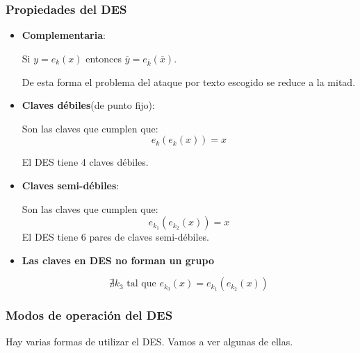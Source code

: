  \subsubsection{Propiedades del DES}
 \begin{itemize}
 	
 
 \item \textbf{Complementaria}: 
 
 Si $y = e_k(x)$ entonces $\overline{y} = e_{\overline{k}}(\overline{x})$.
 
 De esta forma el problema del ataque por texto escogido se reduce a la mitad.
 
 \item \textbf{Claves débiles}(de punto fijo):
 
  Son las claves que cumplen que: $$e_k(e_k(x))= x$$
 
 El DES tiene 4 claves débiles.
 
 \item \textbf{Claves semi-débiles}: 
 
 Son las claves que cumplen que: $$e_{k_1}(e_{k_2}(x)) = x$$
 El DES tiene 6 pares de claves semi-débiles.
 
 \item \textbf{Las claves en DES no forman un grupo}
 
 $$\nexists k_3 \text{ tal que } e_{k_3}(x) = e_{k_1}(e_{k_2}(x))$$
 
\end{itemize}

\subsubsection{Modos de operación del DES}

Hay varias formas de utilizar el DES. Vamos a ver algunas de ellas.

